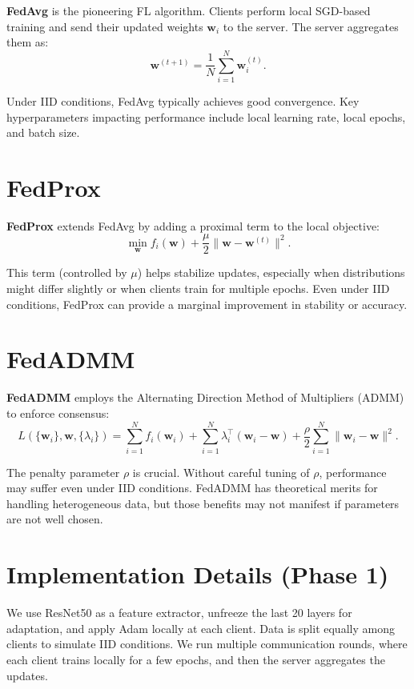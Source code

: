 \documentclass[12pt,a4paper]{report}
\begin{document}
\textbf{FedAvg} is the pioneering FL algorithm. Clients perform local SGD-based training and send their updated weights $\mathbf{w}_i$ to the server. The server aggregates them as:
\[
\mathbf{w}^{(t+1)} = \frac{1}{N}\sum_{i=1}^{N}\mathbf{w}_i^{(t)}.
\]

Under IID conditions, FedAvg typically achieves good convergence. Key hyperparameters impacting performance include local learning rate, local epochs, and batch size.

\section{FedProx}

\textbf{FedProx} extends FedAvg by adding a proximal term to the local objective:
\[
\min_{\mathbf{w}} f_i(\mathbf{w}) + \frac{\mu}{2}\|\mathbf{w}-\mathbf{w}^{(t)}\|^2.
\]

This term (controlled by $\mu$) helps stabilize updates, especially when distributions might differ slightly or when clients train for multiple epochs. Even under IID conditions, FedProx can provide a marginal improvement in stability or accuracy.

\section{FedADMM}

\textbf{FedADMM} employs the Alternating Direction Method of Multipliers (ADMM) to enforce consensus:
\[
L(\{\mathbf{w}_i\}, \mathbf{w}, \{\lambda_i\}) = \sum_{i=1}^{N} f_i(\mathbf{w}_i) + \sum_{i=1}^{N}\lambda_i^\top(\mathbf{w}_i - \mathbf{w}) + \frac{\rho}{2}\sum_{i=1}^{N}\|\mathbf{w}_i - \mathbf{w}\|^2.
\]

The penalty parameter $\rho$ is crucial. Without careful tuning of $\rho$, performance may suffer even under IID conditions. FedADMM has theoretical merits for handling heterogeneous data, but those benefits may not manifest if parameters are not well chosen.

\section{Implementation Details (Phase 1)}

We use ResNet50 as a feature extractor, unfreeze the last 20 layers for adaptation, and apply Adam locally at each client. Data is split equally among clients to simulate IID conditions. We run multiple communication rounds, where each client trains locally for a few epochs, and then the server aggregates the updates.
\end{document}
